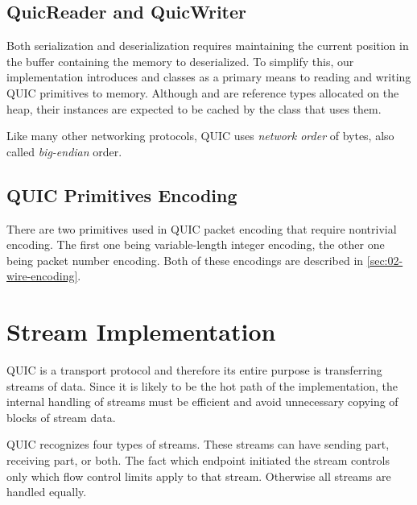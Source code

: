 \subsection{QuicReader and QuicWriter}

Both serialization and deserialization requires maintaining the current position in the buffer
containing the memory to deserialized. To simplify this, our implementation introduces \QuicReader{}
and \QuicWriter{} classes as a primary means to reading and writing QUIC primitives to memory.
Although \QuicReader{} and \QuicWriter{} are reference types allocated on the heap, their instances
are expected to be cached by the class that uses them.

 Like many
other networking protocols, QUIC uses \textit{network order} of bytes, also called
\textit{big-endian} order. 

\subsection{QUIC Primitives Encoding}

There are two primitives used in QUIC packet encoding that require nontrivial encoding. The first
one being variable-length integer encoding, the other one being packet number encoding. Both of
these encodings are described in \autoref{sec:02-wire-encoding}.


\section{Stream Implementation}

QUIC is a transport protocol and therefore its entire purpose is transferring streams of data. Since
it is likely to be the hot path of the implementation, the internal handling of streams must be
efficient and avoid unnecessary copying of blocks of stream data.

QUIC recognizes four types of streams. These streams can have sending part, receiving part, or both.
The fact which endpoint initiated the stream controls only which flow control limits apply to that
stream. Otherwise all streams are handled equally.


